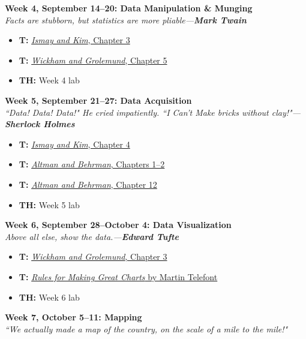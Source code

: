 \documentclass[11pt]{article}
\begin{document}
\textbf{Week 4, September 14--20: Data Manipulation \& Munging}
\\
\textit{Facts are stubborn, but statistics are more pliable---\textbf{Mark Twain}}
\begin{itemize}
\item \textbf{T:} \href{https://moderndive.com/3-wrangling.html}{\textit{Ismay and Kim}, Chapter 3} 
\item \textbf{T:} \href{https://r4ds.had.co.nz/transform.html}{\textit{Wickham and Grolemund}, Chapter 5} 
\item \textbf{TH:} Week 4 lab
\end{itemize}
\vspace{1em}
\textbf{Week 5, September 21--27: Data Acquisition}
\\
\textit{``Data! Data! Data!" He cried impatiently. ``I Can't Make bricks without clay!"---\textbf{Sherlock Holmes}}
\begin{itemize}
\item \textbf{T:} \href{https://moderndive.com/4-tidy.html}{\textit{Ismay and Kim}, Chapter 4} 
\item \textbf{T:} \href{https://steviep42.github.io/webscraping/book/}{\textit{Altman and Behrman}, Chapters 1--2} 
\item \textbf{T:} \href{https://dcl-wrangle.stanford.edu/api-basics.html}{\textit{Altman and Behrman}, Chapter 12} 
\item \textbf{TH:} Week 5 lab
\end{itemize}
\vspace{1em}
\textbf{Week 6, September 28--October 4: Data Visualization}
\\
\textit{Above all else, show the data.---\textbf{Edward Tufte}}
\begin{itemize}
\item \textbf{T:} \href{https://r4ds.had.co.nz/data-visualisation.html}{\textit{Wickham and Grolemund}, Chapter 3} 
\item \textbf{T:} \href{https://medium.com/nightingale/topics-in-dataviz-a-primer-for-getting-started-5d60c5b77d0c}{\textit{Rules for Making Great Charts} by Martin Telefont} 
\item \textbf{TH:} Week 6 lab
\end{itemize}
\vspace{1em}

\textbf{Week 7, October 5--11: Mapping}
\\
\textit{``We actually made a map of the country, on the scale of a mile to the mile!"}
\end{document}
